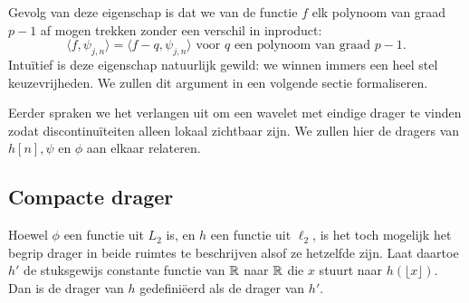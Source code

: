 \begin{gevolg}
  Gevolg van deze eigenschap is dat we van de functie $f$ elk polynoom van graad $p-1$ af mogen trekken zonder een verschil in inproduct:
  \[
  \langle f, \psi_{j,n} \rangle = \langle f - q, \psi_{j,n} \rangle \text{ voor $q$ een polynoom van graad $p-1$}.
  \]
  Intu\"itief is deze eigenschap natuurlijk gewild: we winnen immers een heel stel keuzevrijheden. We zullen dit argument in een volgende sectie formaliseren.
\end{gevolg}

Eerder spraken we het verlangen uit om een wavelet met eindige drager te vinden zodat discontinu\"iteiten alleen lokaal zichtbaar zijn. We zullen hier de dragers van $h[n], \psi$ en $\phi$ aan elkaar relateren.

\subsection{Compacte drager}
Hoewel $\phi$ een functie uit $L_2$ is, en $h$ een functie uit $\ell_2$, is het toch mogelijk het begrip drager in beide ruimtes te beschrijven alsof ze hetzelfde zijn. Laat daartoe $h'$ de stuksgewijs constante functie van $\mathbb{R}$ naar $\mathbb{R}$ die $x$ stuurt naar $h(\lfloor x \rfloor)$. Dan is de drager van $h$ gedefini\"eerd als de drager van $h'$.

